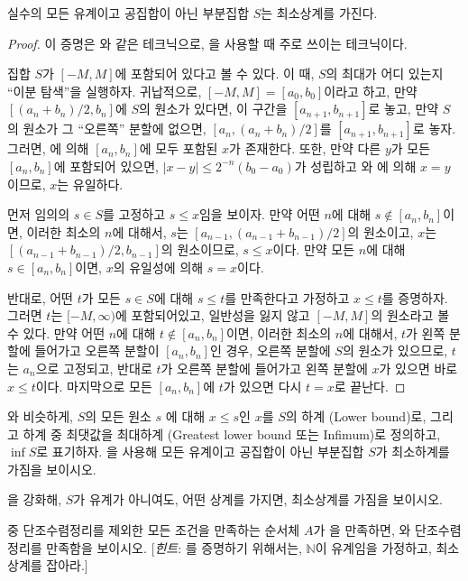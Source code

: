 \begin{theorem}
\label{thm:lubprop}
    실수의 모든 유계이고 공집합이 아닌 부분집합 $S$는 최소상계를 가진다.
\end{theorem}
\begin{proof}
    이 증명은 와 같은 테크닉으로, 을 사용할 때 주로 쓰이는 테크닉이다.
    
    집합 $S$가 $[-M, M]$에 포함되어 있다고 볼 수 있다.
    이 때, $S$의 최대가 어디 있는지 ``이분 탐색''을 실행하자.
    귀납적으로, $[-M, M] = [a_0, b_0]$이라고 하고, 만약 $[(a_n + b_n)/2, b_n]$에 $S$의 원소가 있다면, 이 구간을 $[a_{n + 1}, b_{n + 1}]$로 놓고, 만약 $S$의 원소가 그 ``오른쪽'' 분할에 없으면, $[a_n, (a_n + b_n)/2]$를 $[a_{n + 1}, b_{n + 1}]$로 놓자.
    그러면, 에 의해 $[a_n, b_n]$에 모두 포함된 $x$가 존재한다.
    또한, 만약 다른 $y$가 모든 $[a_n, b_n]$에 포함되어 있으면, $|x - y| \leq 2^{-n}(b_0 - a_0)$가 성립하고 와 에 의해 $x = y$이므로, $x$는 유일하다.

    먼저 임의의 $s \in S$를 고정하고 $s \leq x$임을 보이자.
    만약 어떤 $n$에 대해 $s \not\in [a_n, b_n]$이면, 이러한 최소의 $n$에 대해서, $s$는 $[a_{n - 1}, (a_{n - 1} + b_{n - 1})/2]$의 원소이고, $x$는 $[(a_{n - 1} + b_{n - 1})/2, b_{n - 1}]$의 원소이므로, $s \leq x$이다.
    만약 모든 $n$에 대해 $s \in [a_n, b_n]$이면, $x$의 유일성에 의해 $s = x$이다.

    반대로, 어떤 $t$가 모든 $s \in S$에 대해 $s \leq t$를 만족한다고 가정하고 $x \leq t$를 증명하자.
    그러면 $t$는 $[-M, \infty)$에 포함되어있고, 일반성을 잃지 않고 $[-M, M]$의 원소라고 볼 수 있다.
    만약 어떤 $n$에 대해 $t \not\in [a_n, b_n]$이면, 이러한 최소의 $n$에 대해서, $t$가 왼쪽 분할에 들어가고 오른쪽 분할이 $[a_n, b_n]$인 경우, 오른쪽 분할에 $S$의 원소가 있으므로, $t$는 $a_n$으로 고정되고, 반대로 $t$가 오른쪽 분할에 들어가고 왼쪽 분할에 $x$가 있으면 바로 $x \leq t$이다.
    마지막으로 모든 $[a_n, b_n]$에 $t$가 있으면 다시 $t = x$로 끝난다.
\end{proof}

\begin{exercise}
    와 비슷하게, $S$의 모든 원소 $s$ 에 대해 $x \leq s$인 $x$를 $S$의 하계 (Lower bound)로, 그리고 하계 중 최댓값을 최대하계 (Greatest lower bound 또는 Infimum)로 정의하고, $\inf S$로 표기하자.
    을 사용해 모든 유계이고 공집합이 아닌 부분집합 $S$가 최소하계를 가짐을 보이시오.
\end{exercise}
\begin{exercise}
    을 강화해, $S$가 유계가 아니여도, 어떤 상계를 가지면, 최소상계를 가짐을 보이시오.
\end{exercise}
\begin{exercise}
    중 단조수렴정리를 제외한 모든 조건을 만족하는 순서체 $A$가 을 만족하면, 와 단조수렴정리를 만족함을 보이시오.
    [\textit{힌트}: 를 증명하기 위해서는, $\mathbb{N}$이 유계임을 가정하고, 최소상계를 잡아라.]
\end{exercise}


